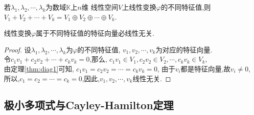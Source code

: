 \begin{theorem}\label{thm:diag1}
  若$\lambda_1, \lambda_2, \cdots, \lambda_k$为数域$\mathbb{K}$上$n$维
  线性空间$V$上线性变换$\varphi$的不同特征值,则
  $V_1 + V_2 + \cdots + V_k =
  V_1 \oplus V_2 \oplus \cdots \oplus V_k$.
\end{theorem}
\begin{deduction}
  线性变换$\varphi$属于不同特征值的特征向量必线性无关.
\end{deduction}
\begin{proof}
  设$\lambda_1, \lambda_2, \cdots, \lambda_k$为$\varphi$的不同特征值,
  $v_1, v_2, \cdots, v_k$为对应的特征向量.\\
  令$c_1v_1+ c_2v_2+ \cdots + c_kv_k = 0$,那么,
  $c_1v_1 \in V_1, c_2v_2 \in V_2, \cdots, c_kv_k \in V_k$,\\
  由定理\ref{thm:diag1}可知, $c_1v_1 = c_2v_2 = \cdots = c_kv_k = 0$,
  由于$v_i$都是特征向量,故$v_i \neq 0$,\\
  所以,$c_1 = c_2 = \cdots = c_k = 0$,因此,$v_1, v_2, \cdots, v_k$线性无关.
\end{proof}

\subsection{极小多项式与Cayley-Hamilton定理}

